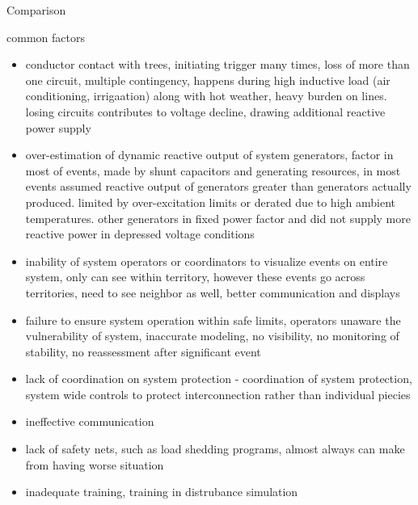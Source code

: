 Comparison

common factors
\begin{itemize}
\item conductor contact with trees, initiating trigger many times, loss of more than one circuit, multiple contingency, happens during high inductive load (air conditioning, irrigaation) along with hot weather, heavy burden on lines.  losing circuits contributes to voltage decline, drawing additional reactive power supply
\item over-estimation of dynamic reactive output of system generators, factor in most of events, made by shunt capacitors and generating resources, in most events assumed reactive output of generators greater than generators actually produced. limited by over-excitation limits or derated due to high ambient temperatures. other generators in fixed power factor and did not supply more reactive power in depressed voltage conditions
\item inability of system operators or coordinators to visualize events on entire system, only can see within territory, however these events go across territories, need to see neighbor as well, better communication and displays
\item failure to ensure system operation within safe limits, operators unaware the vulnerability of system, inaccurate modeling, no visibility, no monitoring of stability, no reassessment after significant event
\item lack of coordination on system protection - coordination of system protection, system wide controls to protect interconnection rather than individual piecies
\item ineffective communication
\item lack of safety nets, such as load shedding programs, almost always can make from having worse situation
\item inadequate training, training in distrubance simulation
\end{itemize}


